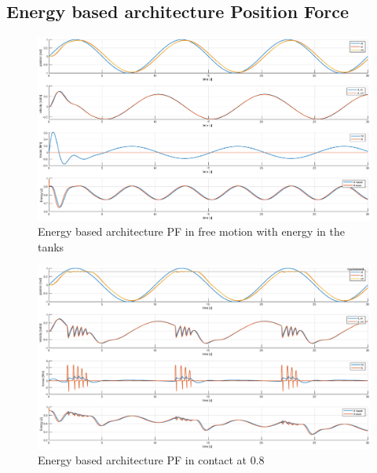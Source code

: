 \documentclass[a4paper,12pt]{article}
\begin{document}
\subsection{Energy based architecture Position Force}
\begin{figure}[H]
    \begin{center}
        \hspace*{-4.5cm}
        \includegraphics[scale=0.5]{images/energy_pf_free.eps}
    \end{center}
    \caption{Energy based architecture PF in free motion with energy in the tanks}
    \label{fig:energy_pf_free}
\end{figure}

\begin{figure}[H]
    \begin{center}
        \hspace*{-4.5cm}
        \includegraphics[scale=0.5]{images/energy_pf_contact.eps}
    \end{center}
    \caption{Energy based architecture PF in contact at 0.8}
    \label{fig:energy_pf_contact}
\end{figure}
\end{document}
